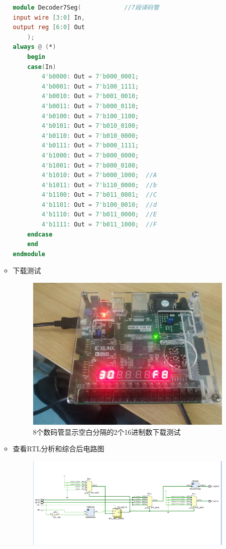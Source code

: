 \documentclass[UTF8,fontset=fandol]{ctexart}
\begin{document}
\begin{itemize}
\begin{itemize}
\begin{lstlisting}[language=Verilog,keywordstyle=\color{red!70}]
module Decoder7Seg(            //7段译码管
input wire [3:0] In,
output reg [6:0] Out
    );
always @ (*)
    begin
    case(In)
        4'b0000: Out = 7'b000_0001;
        4'b0001: Out = 7'b100_1111;
        4'b0010: Out = 7'b001_0010;
        4'b0011: Out = 7'b000_0110;
        4'b0100: Out = 7'b100_1100;
        4'b0101: Out = 7'b010_0100;
        4'b0110: Out = 7'b010_0000;
        4'b0111: Out = 7'b000_1111;
        4'b1000: Out = 7'b000_0000;
        4'b1001: Out = 7'b000_0100;
        4'b1010: Out = 7'b000_1000;  //A
        4'b1011: Out = 7'b110_0000;  //b
        4'b1100: Out = 7'b011_0001;  //C
        4'b1101: Out = 7'b100_0010;  //d
        4'b1110: Out = 7'b011_0000;  //E
        4'b1111: Out = 7'b011_1000;  //F
    endcase
    end       
endmodule
  \end{lstlisting}
  \item 下载测试
  \begin{figure}[H]
    \centering
    \includegraphics[scale=0.2]{微信图片_20211125134742.jpg}
    \caption{8个数码管显示空白分隔的2个16进制数下载测试}
\end{figure}
\item 查看RTL分析和综合后电路图
\begin{figure}[H]
  \centering
  \includegraphics[scale=0.6]{Snipaste_2021-11-25_13-46-46.png}

\end{figure}
\end{itemize}
\end{itemize}
\end{document}
